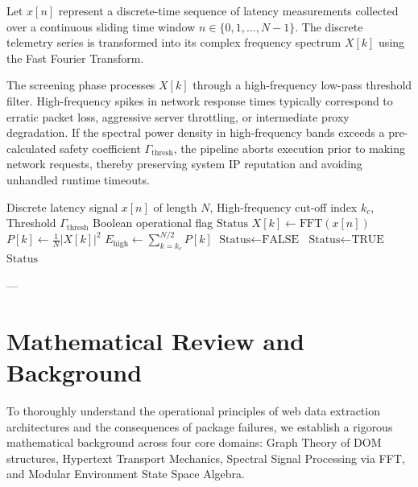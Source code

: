 \documentclass{article}
\begin{document}
Let $x[n]$ represent a discrete-time sequence of latency measurements collected over a continuous sliding time window $n \in \{0, 1, \dots, N-1\}$. The discrete telemetry series is transformed into its complex frequency spectrum $X[k]$ using the Fast Fourier Transform.

The screening phase processes $X[k]$ through a high-frequency low-pass threshold filter. High-frequency spikes in network response times typically correspond to erratic packet loss, aggressive server throttling, or intermediate proxy degradation. If the spectral power density in high-frequency bands exceeds a pre-calculated safety coefficient $\Gamma_{\text{thresh}}$, the pipeline aborts execution prior to making network requests, thereby preserving system IP reputation and avoiding unhandled runtime timeouts.

\begin{algorithm}
\caption{FFT Network Telemetry Screening and Ingestion Protocol}\label{alg:fft_screening}
\begin{algorithmic}[1]
\Require Discrete latency signal $x[n]$ of length $N$, High-frequency cut-off index $k_c$, Threshold $\Gamma_{\text{thresh}}$
\Ensure Boolean operational flag $\text{Status}$
\State $X[k] \gets \text{FFT}(x[n])$ 
\State $P[k] \gets \frac{1}{N} |X[k]|^2$ 
\State $E_{\text{high}} \gets \sum_{k=k_c}^{N/2} P[k]$ 
    \State $\text{Status} \gets \text{FALSE}$ 
\Else
    \State $\text{Status} \gets \text{TRUE}$ 
\EndIf
\Return $\text{Status}$
\end{algorithmic}
\end{algorithm}

---

\section{Mathematical Review and Background}

To thoroughly understand the operational principles of web data extraction architectures and the consequences of package failures, we establish a rigorous mathematical background across four core domains: Graph Theory of DOM structures, Hypertext Transport Mechanics, Spectral Signal Processing via FFT, and Modular Environment State Space Algebra.
\end{document}
